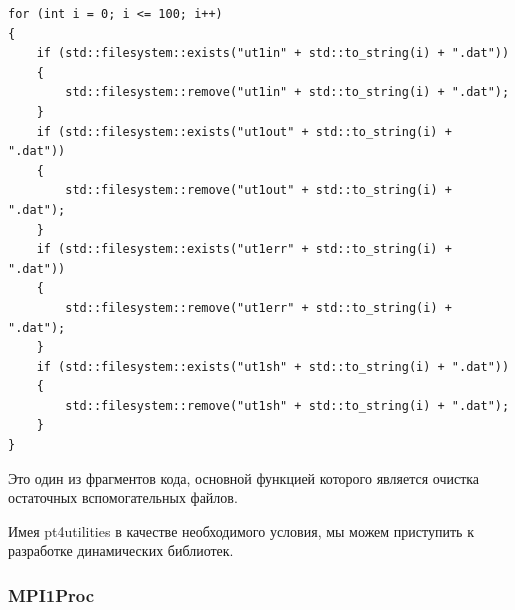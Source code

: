 \lstset{language=c++}
\begin{lstlisting}
for (int i = 0; i <= 100; i++)
{
    if (std::filesystem::exists("ut1in" + std::to_string(i) + ".dat"))
    {
        std::filesystem::remove("ut1in" + std::to_string(i) + ".dat");
    }
    if (std::filesystem::exists("ut1out" + std::to_string(i) + ".dat"))
    {
        std::filesystem::remove("ut1out" + std::to_string(i) + ".dat");
    }
    if (std::filesystem::exists("ut1err" + std::to_string(i) + ".dat"))
    {
        std::filesystem::remove("ut1err" + std::to_string(i) + ".dat");
    }
    if (std::filesystem::exists("ut1sh" + std::to_string(i) + ".dat"))
    {
        std::filesystem::remove("ut1sh" + std::to_string(i) + ".dat");
    }
}
\end{lstlisting}

Это один из фрагментов кода, основной функцией которого является очистка остаточных вспомогательных файлов.

Имея pt4utilities в качестве необходимого условия, мы можем приступить к разработке динамических библиотек.

\subsubsection{MPI1Proc}


